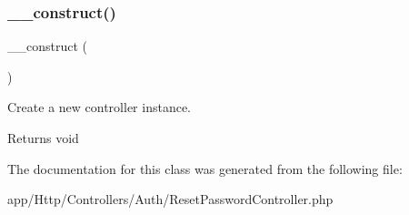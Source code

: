 \subsubsection{\texorpdfstring{\_\_construct()}{\_\_construct()}}
{\footnotesize\ttfamily \+\_\+\+\_\+construct (\begin{DoxyParamCaption}{ }\end{DoxyParamCaption})}

Create a new controller instance.

\begin{DoxyReturn}{Returns}
void 
\end{DoxyReturn}


The documentation for this class was generated from the following file\+:\begin{DoxyCompactItemize}
\item 
app/\+Http/\+Controllers/\+Auth/Reset\+Password\+Controller.\+php\end{DoxyCompactItemize}
